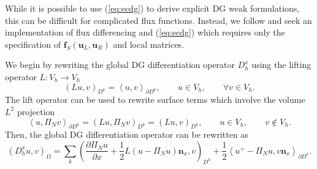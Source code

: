 \documentclass[preprint,10pt]{article}
\theoremstyle{definition}
\theoremstyle{lemma}
\theoremstyle{theorem}
\theoremstyle{assumption}
\newcommand{\pd}[2]{\frac{\partial#1}{\partial#2}}
\newcommand{\LRp}[1]{\left( #1 \right)}
\newcommand{\LRa}[1]{\left\langle #1 \right\rangle}
\begin{document}
While it is possible to use (\ref{eq:ecdg}) to derive explicit DG weak formulations, this can be difficult for complicated flux functions.  Instead, we follow \cite{gassner2016split, chen2017entropy} and seek an implementation of flux differencing and (\ref{eq:ecdg}) which requires only the specification of $\bm{f}_S(\bm{u}_L,\bm{u}_R)$ and local matrices.  

We begin by rewriting the global DG differentiation operator $D^x_h$ using the lifting operator  ${L}: V_h \rightarrow V_h$ \cite{hesthaven2007nodal, di2011mathematical}
\[
\LRp{{L} u,v}_{D^k} = \LRa{u,v}_{\partial D^k}, \qquad u \in V_h, \qquad \forall v\in V_h.
\]
The lift operator can be used to rewrite surface terms which involve the volume $L^2$ projection
\[
\LRa{u,\Pi_Nv}_{\partial D^k} = \LRp{Lu,\Pi_N v}_{D^k} = \LRp{Lu,v}_{D^k}, \qquad u\in V_h, \qquad v\not\in V_h.  
\]
Then, the global DG differentiation operator can be rewritten as 
\begin{equation}
\LRp{D^x_h u,v}_{\Omega} = \sum_k \LRp{\pd{ \Pi_N u}{x} + \frac{1}{2}L\LRp{u-\Pi_N u}\bm{n}_x,v}_{D^k} + \frac{1}{2}{\LRa{{u^+ - \Pi_N u}, v\bm{n}_x}_{\partial D^k}}.
\label{eq:dgd_globalimplement}
\end{equation}
\end{document}
